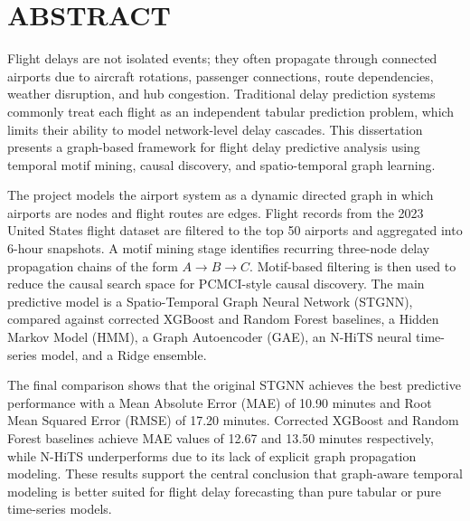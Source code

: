\documentclass[12pt,a4paper]{report}
\begin{document}
\clearpage
\section*{ABSTRACT}
\noindent{\rule{\textwidth}{1.5pt}}
Flight delays are not isolated events; they often propagate through connected airports due to aircraft rotations, passenger connections, route dependencies, weather disruption, and hub congestion. Traditional delay prediction systems commonly treat each flight as an independent tabular prediction problem, which limits their ability to model network-level delay cascades. This dissertation presents a graph-based framework for flight delay predictive analysis using temporal motif mining, causal discovery, and spatio-temporal graph learning.

The project models the airport system as a dynamic directed graph in which airports are nodes and flight routes are edges. Flight records from the 2023 United States flight dataset are filtered to the top 50 airports and aggregated into 6-hour snapshots. A motif mining stage identifies recurring three-node delay propagation chains of the form $A \rightarrow B \rightarrow C$. Motif-based filtering is then used to reduce the causal search space for PCMCI-style causal discovery. The main predictive model is a Spatio-Temporal Graph Neural Network (STGNN), compared against corrected XGBoost and Random Forest baselines, a Hidden Markov Model (HMM), a Graph Autoencoder (GAE), an N-HiTS neural time-series model, and a Ridge ensemble.

The final comparison shows that the original STGNN achieves the best predictive performance with a Mean Absolute Error (MAE) of 10.90 minutes and Root Mean Squared Error (RMSE) of 17.20 minutes. Corrected XGBoost and Random Forest baselines achieve MAE values of 12.67 and 13.50 minutes respectively, while N-HiTS underperforms due to its lack of explicit graph propagation modeling. These results support the central conclusion that graph-aware temporal modeling is better suited for flight delay forecasting than pure tabular or pure time-series models.

\clearpage
\tableofcontents
\listoffigures
{}
\listoftables
{}
\listofalgorithms
{}
\end{document}
